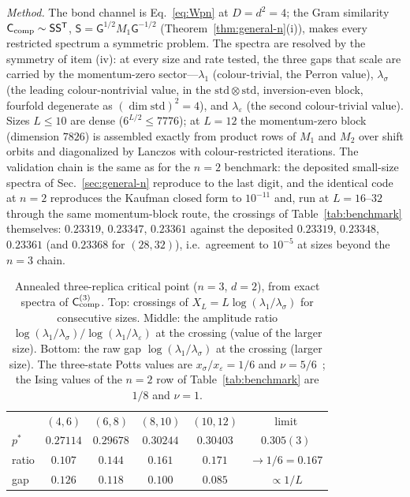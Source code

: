 \documentclass[aps,prx,reprint,superscriptaddress,nobibnotes,longbibliography]{revtex4-2}
\theoremstyle{remark}
\newcommand{\Ccomp}{\mathsf C_{\rm comp}}
\begin{document}
\emph{Method.}  The bond channel is Eq.~\eqref{eq:Wpn} at $D=d^2=4$; the Gram similarity $\Ccomp\sim\mathsf S\mathsf S^{\mathsf T}$, $\mathsf S=\mathsf G^{1/2}M_1\mathsf G^{-1/2}$ (Theorem~\ref{thm:general-n}(i)), makes every restricted spectrum a symmetric problem.  The spectra are resolved by the symmetry of item (iv): at every size and rate tested, the three gaps that scale are carried by the momentum-zero sector---$\lambda_1$ (colour-trivial, the Perron value), $\lambda_\sigma$ (the leading colour-nontrivial value, in the $\mathrm{std}\otimes\mathrm{std}$, inversion-even block, fourfold degenerate as $(\dim\mathrm{std})^2=4$), and $\lambda_\varepsilon$ (the second colour-trivial value).  Sizes $L\le10$ are dense ($6^{L/2}\le7776$); at $L=12$ the momentum-zero block (dimension $7826$) is assembled exactly from product rows of $M_1$ and $M_2$ over shift orbits and diagonalized by Lanczos with colour-restricted iterations.  The validation chain is the same as for the $n=2$ benchmark: the deposited small-size spectra of Sec.~\ref{sec:general-n} reproduce to the last digit, and the identical code at $n=2$ reproduces the Kaufman closed form to $10^{-11}$ and, run at $L=16$--$32$ through the same momentum-block route, the crossings of Table~\ref{tab:benchmark} themselves: $0.23319$, $0.23347$, $0.23361$ against the deposited $0.23319$, $0.23348$, $0.23361$ (and $0.23368$ for $(28,32)$), i.e.\ agreement to $10^{-5}$ at sizes beyond the $n=3$ chain.

\begin{table}[t]
\caption{Annealed three-replica critical point ($n=3$, $d=2$), from exact spectra of $\Ccomp^{(3)}$.  Top: crossings of $X_L=L\log(\lambda_1/\lambda_\sigma)$ for consecutive sizes.  Middle: the amplitude ratio $\log(\lambda_1/\lambda_\sigma)/\log(\lambda_1/\lambda_\varepsilon)$ at the crossing (value of the larger size).  Bottom: the raw gap $\log(\lambda_1/\lambda_\sigma)$ at the crossing (larger size).  The three-state Potts values are $x_\sigma/x_\varepsilon=1/6$ and $\nu=5/6$~\cite{Wu1982}; the Ising values of the $n=2$ row of Table~\ref{tab:benchmark} are $1/8$ and $\nu=1$.}
\label{tab:n3annealed}
\begin{ruledtabular}
\begin{tabular}{lccccc}
 & $(4,6)$ & $(6,8)$ & $(8,10)$ & $(10,12)$ & limit \\
\colrule
$p^*$ & $0.27114$ & $0.29678$ & $0.30244$ & $0.30403$ & $0.305(3)$ \\
ratio & $0.107$ & $0.144$ & $0.161$ & $0.171$ & $\to1/6=0.167$ \\
gap & $0.126$ & $0.118$ & $0.100$ & $0.085$ & $\propto1/L$ \\
\end{tabular}
\end{ruledtabular}
\end{table}
\end{document}
